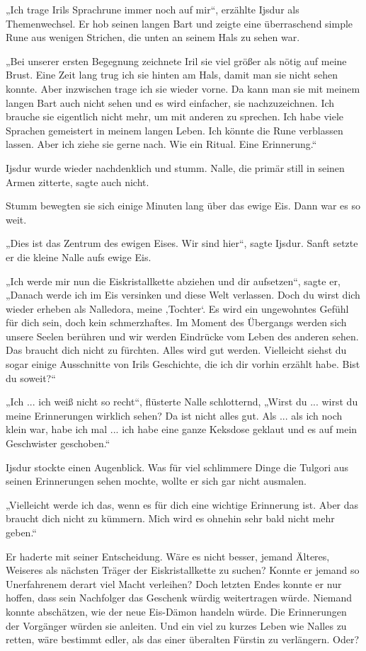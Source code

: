 „Ich trage Irils Sprachrune immer noch auf mir“, erzählte Ijsdur als Themenwechsel. Er hob seinen langen Bart und zeigte eine überraschend simple Rune aus wenigen Strichen, die unten an seinem Hals zu sehen war.

„Bei unserer ersten Begegnung zeichnete Iril sie viel größer als nötig auf meine Brust. Eine Zeit lang trug ich sie hinten am Hals, damit man sie nicht sehen konnte. Aber inzwischen trage ich sie wieder vorne. Da kann man sie mit meinem langen Bart auch nicht sehen und es wird einfacher, sie nachzuzeichnen. Ich brauche sie eigentlich nicht mehr, um mit anderen zu sprechen. Ich habe viele Sprachen gemeistert in meinem langen Leben. Ich könnte die Rune verblassen lassen. Aber ich ziehe sie gerne nach. Wie ein Ritual. Eine Erinnerung.“

Ijsdur wurde wieder nachdenklich und stumm. Nalle, die primär still in seinen Armen zitterte, sagte auch nicht.

Stumm bewegten sie sich einige Minuten lang über das ewige Eis. Dann war es so weit.

„Dies ist das Zentrum des ewigen Eises. Wir sind hier“, sagte Ijsdur. Sanft setzte er die kleine Nalle aufs ewige Eis.

„Ich werde mir nun die Eiskristallkette abziehen und dir aufsetzen“, sagte er, „Danach werde ich im Eis versinken und diese Welt verlassen. Doch du wirst dich wieder erheben als Nalledora, meine ‚Tochter‘. Es wird ein ungewohntes Gefühl für dich sein, doch kein schmerzhaftes. Im Moment des Übergangs werden sich unsere Seelen berühren und wir werden Eindrücke vom Leben des anderen sehen. Das braucht dich nicht zu fürchten. Alles wird gut werden. Vielleicht siehst du sogar einige Ausschnitte von Irils Geschichte, die ich dir vorhin erzählt habe. Bist du soweit?“

„Ich ... ich weiß nicht so recht“, flüsterte Nalle schlotternd, „Wirst du ... wirst du meine Erinnerungen wirklich sehen? Da ist nicht alles gut. Als ... als ich noch klein war, habe ich mal ... ich habe eine ganze Keksdose geklaut und es auf mein Geschwister geschoben.“

Ijsdur stockte einen Augenblick. Was für viel schlimmere Dinge die Tulgori aus seinen Erinnerungen sehen mochte, wollte er sich gar nicht ausmalen.

„Vielleicht werde ich das, wenn es für dich eine wichtige Erinnerung ist. Aber das braucht dich nicht zu kümmern. Mich wird es ohnehin sehr bald nicht mehr geben.“

Er haderte mit seiner Entscheidung. Wäre es nicht besser, jemand Älteres, Weiseres als nächsten Träger der Eiskristallkette zu suchen? Konnte er jemand so Unerfahrenem derart viel Macht verleihen? Doch letzten Endes konnte er nur hoffen, dass sein Nachfolger das Geschenk würdig weitertragen würde. Niemand konnte abschätzen, wie der neue Eis-Dämon handeln würde. Die Erinnerungen der Vorgänger würden sie anleiten. Und ein viel zu kurzes Leben wie Nalles zu retten, wäre bestimmt edler, als das einer überalten Fürstin zu verlängern. Oder?

